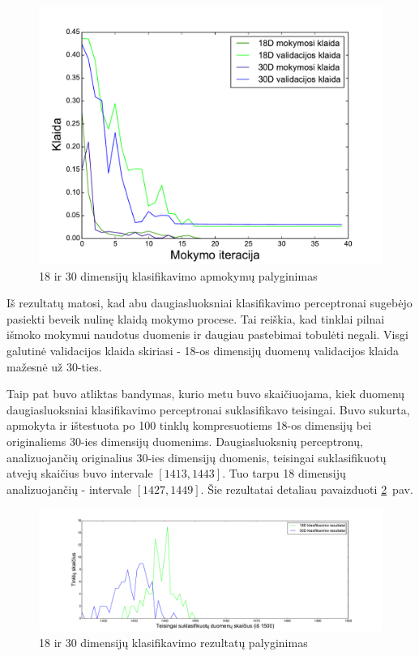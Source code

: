 \documentclass{VUMIFPSbakalaurinis}
\begin{document}
\begin{figure}[H]
	\centering
	\includegraphics[scale=0.8]{pics/dim_comparisons_2015-5-27_14-21-13}
	\caption{18 ir 30 dimensijų klasifikavimo apmokymų palyginimas}
	\label{fig:dim-comparisons}
\end{figure}

Iš rezultatų matosi, kad abu daugiasluoksniai klasifikavimo perceptronai sugebėjo pasiekti beveik nulinę klaidą mokymo procese.
Tai reiškia, kad tinklai pilnai išmoko mokymui naudotus duomenis ir daugiau pastebimai tobulėti negali.
Visgi galutinė validacijos klaida skiriasi - 18-os dimensijų duomenų validacijos klaida mažesnė už 30-ties.

Taip pat buvo atliktas bandymas, kurio metu buvo skaičiuojama, kiek duomenų daugiasluoksniai klasifikavimo perceptronai suklasifikavo teisingai.
Buvo sukurta, apmokyta ir ištestuota po 100 tinklų kompresuotiems 18-os dimensijų bei originaliems 30-ies dimensijų duomenims.
Daugiasluoksnių perceptronų, analizuojančių originalius 30-ies dimensijų duomenis, teisingai suklasifikuotų atvejų skaičius buvo intervale $[1413, 1443]$.
Tuo tarpu 18 dimensijų analizuojančių - intervale $[1427, 1449]$.
Šie rezultatai detaliau pavaizduoti \ref{fig:correct-count}~pav.

\begin{figure}[h]
	\centering
	\centerline{\includegraphics[scale=0.43]{pics/correct}}
	\caption{18 ir 30 dimensijų klasifikavimo rezultatų palyginimas}
	\label{fig:correct-count}
\end{figure}
\end{document}
